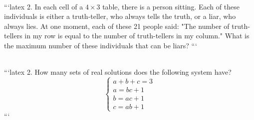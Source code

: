 \\
```latex
2. In each cell of a $4 \times 3$ table, there is a person sitting. Each of these individuals is either a truth-teller, who always tells the truth, or a liar, who always lies. At one moment, each of these 21 people said: "The number of truth-tellers in my row is equal to the number of truth-tellers in my column." What is the maximum number of these individuals that can be liars?
```

\\
```latex
2. How many sets of real solutions does the following system have?  
\[
\begin{cases} 
a + b + c = 3 \\ 
a = bc + 1 \\ 
b = ac + 1 \\ 
c = ab + 1 
\end{cases}
\]
```

\\
